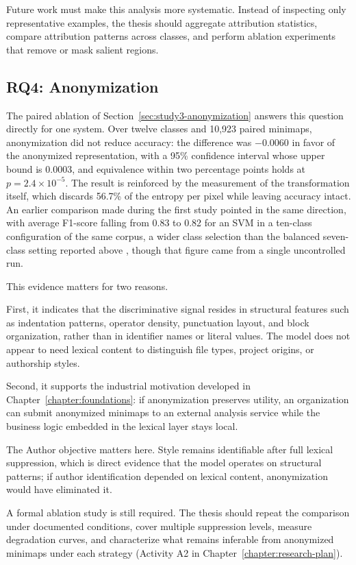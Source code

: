 Future work must make this analysis more systematic. Instead of inspecting only
representative examples, the thesis should aggregate attribution statistics,
compare attribution patterns across classes, and perform ablation experiments
that remove or mask salient regions.

\subsection{RQ4: Anonymization}

The paired ablation of Section~\ref{sec:study3-anonymization} answers this
question directly for one system. Over twelve classes and 10,923 paired
minimaps, anonymization did not reduce accuracy: the difference was $-0.0060$ in
favor of the anonymized representation, with a 95\% confidence interval whose
upper bound is 0.0003, and equivalence within two percentage points holds at
$p = 2.4 \times 10^{-5}$. The result is reinforced by the measurement of the
transformation itself, which discards 56.7\% of the entropy per pixel while
leaving accuracy intact. An earlier comparison made during the first study
pointed in the same direction, with average F1-score falling from 0.83 to 0.82
for an SVM in a ten-class configuration of the same corpus, a wider class
selection than the balanced seven-class setting reported above
\cite{gebara2025iwssip}, though that figure came from a single uncontrolled
run.

This evidence matters for two reasons.

First, it indicates that the discriminative signal resides in structural
features such as indentation patterns, operator density, punctuation layout,
and block organization, rather than in identifier names or literal values. The
model does not appear to need lexical content to distinguish file types,
project origins, or authorship styles.

Second, it supports the industrial motivation developed in
Chapter~\ref{chapter:foundations}: if anonymization preserves utility, an
organization can submit anonymized minimaps to an external analysis service
while the business logic embedded in the lexical layer stays local.

The Author objective matters here. Style remains identifiable after full
lexical suppression, which is direct evidence that the model operates on
structural patterns; if author identification depended on lexical content,
anonymization would have eliminated it.

A formal ablation study is still required. The thesis should repeat the
comparison under documented conditions, cover multiple suppression levels,
measure degradation curves, and characterize what remains inferable from
anonymized minimaps under each strategy (Activity A2 in
Chapter~\ref{chapter:research-plan}).

